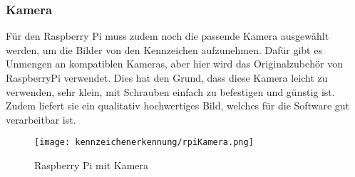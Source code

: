 \subsubsection{Kamera}
Für den Raspberry Pi muss zudem noch die passende Kamera ausgewählt werden, um die Bilder von den Kennzeichen aufzunehmen. 
Dafür gibt es Unmengen an kompatiblen Kameras, aber hier wird das Originalzubehör von RaspberryPi verwendet. Dies hat den Grund, 
dass diese Kamera leicht zu verwenden, sehr klein, mit Schrauben einfach zu befestigen und günstig ist. Zudem liefert sie ein 
qualitativ hochwertiges Bild, welches für die Software gut verarbeitbar ist.

\begin{figure}[H]
    \centering
    \texttt{[image: kennzeichenerkennung/rpiKamera.png]}
    \caption{Raspberry Pi mit Kamera}
\end{figure}